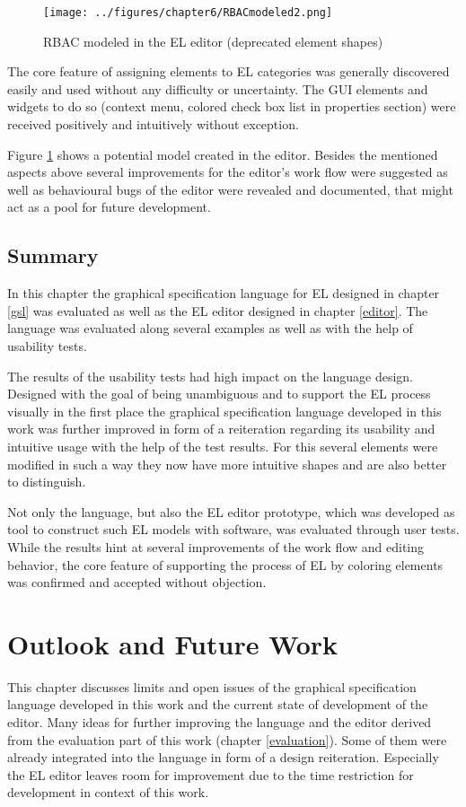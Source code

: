\documentclass[twoside, openright, 12pt]{book}
\begin{document}
\begin{figure}[bht]
	\centering
	\texttt{[image: ../figures/chapter6/RBACmodeled2.png]}
	\caption{RBAC modeled in the EL editor (deprecated element shapes)}
	\label{fig:RBACmodeled2}
\end{figure}

The core feature of assigning elements to EL categories was generally discovered easily and used without any difficulty or uncertainty.
The GUI elements and widgets to do so (context menu, colored check box list in properties section) were received positively and intuitively without exception.

Figure \ref{fig:RBACmodeled2} shows a potential model created in the editor.
Besides the mentioned aspects above several improvements for the editor's work flow were suggested as well as behavioural bugs of the editor were revealed and documented, that might act as a pool for future development.



\section{Summary}
\label{eval_summary}
In this chapter the graphical specification language for EL designed in chapter \ref{gsl} was evaluated as well as the EL editor designed in chapter \ref{editor}.
The language was evaluated along several examples as well as with the help of usability tests.

The results of the usability tests had high impact on the language design.
Designed with the goal of being unambiguous and to support the EL process visually in the first place the graphical specification language developed in this work was further improved in form of a reiteration regarding its usability and intuitive usage with the help of the test results.
For this several elements were modified in such a way they now have more intuitive shapes and are also better to distinguish.

Not only the language, but also the EL editor prototype, which was developed as tool to construct such EL models with software, was evaluated through user tests.
While the results hint at several improvements of the work flow and editing behavior, the core feature of supporting the process of EL by coloring elements was confirmed and accepted without objection.



\cleardoublepage
\chapter{Outlook and Future Work}
\label{future_work}
This chapter discusses limits and open issues of the graphical specification language developed in this work and the current state of development of the editor.
Many ideas for further improving the language and the editor derived from the evaluation part of this work (chapter \ref{evaluation}).
Some of them were already integrated into the language in form of a design reiteration.
Especially the EL editor leaves room for improvement due to the time restriction for development in context of this work.
\end{document}
